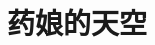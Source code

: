 \documentclass[fontsize=12pt,paper=a5,pagesize=auto]{ctexbook}
\begin{document}
\title{药娘的天空}

\begin{titlepage}
    
    \maketitle
\end{titlepage}

\tableofcontents


\end{document}
